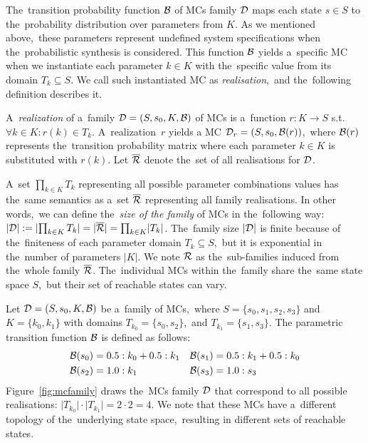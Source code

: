 The~transition probability function $\mathcal{B}$ of MCs family $\mathcal{D}$ maps each state $s \in S$ to the~probability distribution over parameters from $K$.
As we mentioned above,~these parameters represent undefined system specifications when the~probabilistic synthesis is considered.
This function $\mathcal{B}$ yields a~specific MC when we instantiate each parameter $k \in K$ with the~specific value from its domain $T_k \subseteq S$.
We call such instantiated MC as \textit{realisation},~and the~following definition describes it.

\begin{definition}[Realisation]
\cite{cegar}
A~\emph{realization} of a~family $\mathcal{D} = (S,s_{0},K,\mathcal{B})$ of MCs is a~function $r: K \rightarrow S$ s.t.~$\forall k \in K :  r(k) \in T_k$. 
A~realization~$r$ yields a MC $\mathcal{D}_r = (S,s_{0},\mathcal{B}(r))$,~where $\mathcal{B}(r)$ represents the~transition probability matrix where each parameter $k \in K$ is substituted with $r(k)$. 
Let $\overline{\mathcal{R}}$ denote the~set of all realisations for $\mathcal{D}$.
\end{definition}

A~set $\prod_{k \in K} T_k$ representing all possible parameter combinations values has the~same semantics as a~set $\overline{\mathcal{R}}$ representing all family realisations.
In other words,~we can define the~\textit{size of the family} of MCs in the~following way: $\lvert \mathcal{D} \rvert := \lvert \prod_{k \in K} T_k \rvert = \lvert \overline{\mathcal{R}} \rvert = \prod_{k \in K} \lvert T_k \rvert$.
The~family size $\lvert \mathcal{D} \rvert$ is finite because of the~finiteness of each parameter domain $T_k \subseteq S$,~but it is exponential in the~number of parameters $\lvert K \rvert$.
We note $\mathcal{R}$ as the~sub-families induced from the~whole family $\overline{\mathcal{R}}$.
The~individual MCs within the~family share the~same state space $S$,~but their set of reachable states can vary.

\begin{example}\label{exam:mcfamily}
Let $\mathcal{D} = (S,s_{0},K,\mathcal{B})$ be a~family of MCs,~where $S = \{s_0, s_1, s_2, s_3\}$ and $K = \{ k_0, k_1\}$ with domains $T_{k_0} = \{s_0, s_2\}$,~and $T_{k_1} = \{s_1, s_3\}$.
The parametric transition function $\mathcal{B}$ is defined as follows:
\begin{align*}
    \mathcal{B}(s_0) &= 0.5 : k_0 + 0.5 : k_1  &  \mathcal{B}(s_1)  &= 0.5 : k_1  + 0.5 : k_0 \\
    \mathcal{B}(s_2) &= 1.0: k_1   &  \mathcal{B}(s_3)  &= 1.0 : s_3
\end{align*}
Figure~\ref{fig:mcfamily} draws the~MCs family $\mathcal{D}$ that correspond to all possible realisations: $\lvert T_{k_0} \rvert \cdot \lvert T_{k_1} \rvert = 2 \cdot 2 = 4$.
We note that these MCs have a~different topology of the~underlying state space,~resulting in different sets of reachable states.
\end{example}

